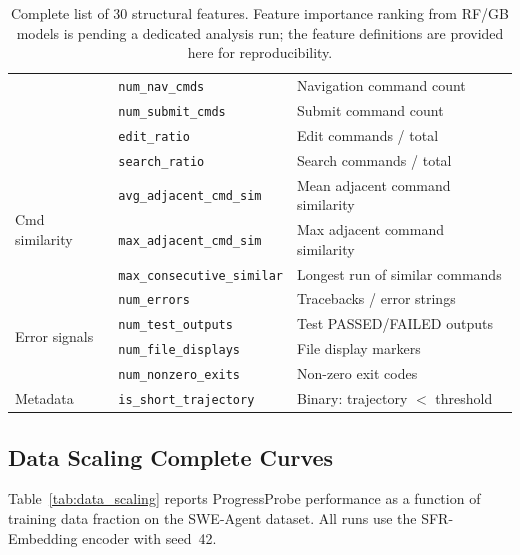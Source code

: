 \begin{table}[h]
\begin{tabular}{lll}
  & \texttt{num\_nav\_cmds} & Navigation command count \\
  & \texttt{num\_submit\_cmds} & Submit command count \\
  & \texttt{edit\_ratio} & Edit commands / total \\
  & \texttt{search\_ratio} & Search commands / total \\
\midrule
\multirow{3}{*}{Cmd similarity}
  & \texttt{avg\_adjacent\_cmd\_sim} & Mean adjacent command similarity \\
  & \texttt{max\_adjacent\_cmd\_sim} & Max adjacent command similarity \\
  & \texttt{max\_consecutive\_similar} & Longest run of similar commands \\
\midrule
\multirow{4}{*}{Error signals}
  & \texttt{num\_errors} & Tracebacks / error strings \\
  & \texttt{num\_test\_outputs} & Test PASSED/FAILED outputs \\
  & \texttt{num\_file\_displays} & File display markers \\
  & \texttt{num\_nonzero\_exits} & Non-zero exit codes \\
\midrule
\multirow{1}{*}{Metadata}
  & \texttt{is\_short\_trajectory} & Binary: trajectory $<$ threshold \\
\bottomrule
\end{tabular}
\caption{Complete list of 30 structural features. Feature importance ranking from RF/GB models is pending a dedicated analysis run; the feature definitions are provided here for reproducibility.}
\label{tab:feature_list}
\end{table}

\subsection{Data Scaling Complete Curves}
\label{sec:app_scaling}

Table~\ref{tab:data_scaling} reports ProgressProbe performance as a function of training data fraction on the SWE-Agent dataset.
All runs use the SFR-Embedding encoder with seed~42.

